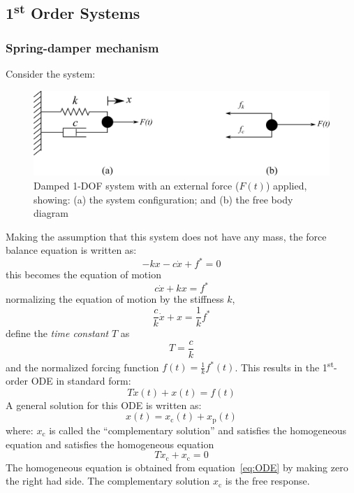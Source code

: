 \documentclass[12pt,letter]{article}
\numberwithin{ex}{section} %
\numberwithin{re}{section} %
\numberwithin{equation}{section}	%
\begin{document}
	\subsection{1\textsuperscript{st} Order Systems}	




	\subsubsection{Spring-damper mechanism}


Consider the system:
\begin{figure}[H]
	\centering
	\includegraphics[]{../figures/1-DOF-spring_dashpot_horizontal_forced_FBD.png}
	\caption{Damped 1-DOF system with an external force ($F(t)$) applied, showing: (a) the system configuration; and (b) the free body diagram}
\end{figure}	
Making the assumption that this system does not have any mass, the force balance equation is written as: 
\begin{equation}
-kx - c\dot{x} + f^* =0
\end{equation}
this becomes the equation of motion
\begin{equation}
c\dot{x} + kx = f^*
\end{equation}
normalizing the equation of motion by the stiffness $k$, 
\begin{equation}
\frac{c}{k}\dot{x} + x = \frac{1}{k}f^*
\end{equation}
define the \emph{time constant} $T$ as 
\begin{equation}
T=\frac{c}{k}
\end{equation}
and the normalized forcing function $f(t) = \frac{1}{k}f^*(t)$. This results in the 1\textsuperscript{st}-order ODE in standard form:
\begin{equation}
T\dot{x}(t) + x(t) = f(t)
\label{eq:ODE}
\end{equation}
A general solution for this ODE is written as:
\begin{equation}
x(t) = x_\text{c}(t)+x_\text{p}(t)
\label{eq:ODE_solution}
\end{equation}
where: $x_\text{c}$ is called the ``complementary solution'' and satisfies the homogeneous equation and satisfies the homogeneous equation 
\begin{equation}
T\dot{x}_\text{c} + x_\text{c} = 0
\end{equation}
The homogeneous equation is obtained from equation~\ref{eq:ODE} by making zero the right had side.  The complementary solution $x_\text{c}$ is the free response.
\end{document}
